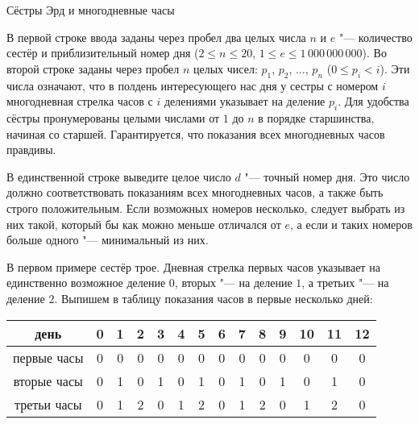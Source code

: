\begin{problem}{Сёстры Эрд и многодневные часы}
\ifdefined\newpageafterlegend\newpage\fi

\InputFile

В первой строке ввода заданы через пробел два целых числа
$n$ и $e$ "--- количество сестёр и приблизительный номер дня
($2 \le n \le 20$, $1 \le e \le 1\,000\,000\,000$).
Во второй строке заданы через пробел $n$ целых чисел:
$p_1$, $p_2$, $\ldots$, $p_n$
($0 \le p_i < i$).
Эти числа означают, что в полдень интересующего нас дня у сестры
с номером $i$ многодневная стрелка часов с $i$ делениями
указывает на деление $p_i$.
Для удобства сёстры пронумерованы целыми числами от $1$ до $n$
в порядке старшинства, начиная со старшей.
Гарантируется, что показания всех многодневных часов правдивы.

\OutputFile

В единственной строке выведите целое число $d$ "--- точный номер дня.
Это число должно соответствовать показаниям всех многодневных часов,
а также быть строго положительным.
Если возможных номеров несколько, следует выбрать из них такой,
который бы как можно меньше отличался от $e$,
а если и таких номеров больше одного "--- минимальный из них.

\Examples

\begin{example}
%
%
\end{example}

\Explanations

В первом примере сестёр трое.
Дневная стрелка первых часов указывает на единственно возможное деление $0$,
вторых "--- на деление $1$, а третьих "--- на деление $2$.
Выпишем в таблицу показания часов в первые несколько дней:


\begin{tabular}{|c|c|c|c|c|c|c|c|c|c|c|c|c|c|}
\hline
день        &  0 &  1 &  2 &  3 &  4 &  5 &  6 &  7 &  8 &  9 & 10 & 11 & 12 \\
\hline
первые часы &  0 &  0 &  0 &  0 &  0 &  0 &  0 &  0 &  0 &  0 &  0 &  0 &  0 \\
\hline
вторые часы &  0 &  1 &  0 &  1 &  0 &  1 &  0 &  1 &  0 &  1 &  0 &  1 &  0 \\
\hline
третьи часы &  0 &  1 &  2 &  0 &  1 &  2 &  0 &  1 &  2 &  0 &  1 &  2 &  0 \\
\hline
\end{tabular}


\end{problem}
